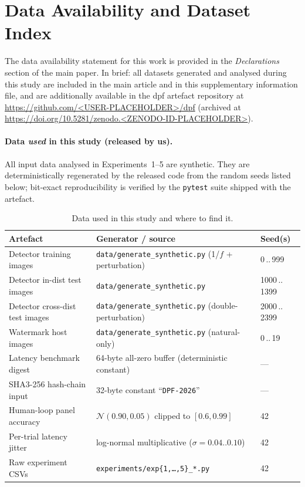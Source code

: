 \documentclass[11pt,a4paper]{article}
\begin{document}
\section{Data Availability and Dataset Index}\label{sec:data-availability}

The data availability statement for this work is provided in the
\emph{Declarations} section of the main paper. In brief: all
datasets generated and analysed during this study are included in
the main article and in this supplementary information file, and
are additionally available in the dpf artefact repository at
\url{https://github.com/<USER-PLACEHOLDER>/dpf}
(archived at
\url{https://doi.org/10.5281/zenodo.<ZENODO-ID-PLACEHOLDER>}).

\paragraph{Data \emph{used} in this study (released by us).}
All input data analysed in Experiments~1--5 are synthetic. They are
deterministically regenerated by the released code from the random
seeds listed below; bit-exact reproducibility is verified by the
\texttt{pytest} suite shipped with the artefact.

\begin{table}[!ht]\centering
\caption{Data used in this study and where to find it.}
\label{tab:data-index}
\small
\setlength{\tabcolsep}{4pt}
\begin{tabular}{l l l}
\toprule
Artefact & Generator / source & Seed(s) \\
\midrule
Detector training images        & \texttt{data/generate\_synthetic.py} (1/$f$ + perturbation) & 0\,..\,999 \\
Detector in-dist test images    & \texttt{data/generate\_synthetic.py} & 1000\,..\,1399 \\
Detector cross-dist test images & \texttt{data/generate\_synthetic.py} (double-perturbation) & 2000\,..\,2399 \\
Watermark host images           & \texttt{data/generate\_synthetic.py} (natural-only) & 0\,..\,19 \\
Latency benchmark digest        & 64-byte all-zero buffer (deterministic constant) & --- \\
SHA3-256 hash-chain input       & 32-byte constant ``\texttt{DPF-2026}'' & --- \\
Human-loop panel accuracy       & $\mathcal{N}(0.90,0.05)$ clipped to $[0.6, 0.99]$ & 42 \\
Per-trial latency jitter        & log-normal multiplicative ($\sigma=0.04..0.10$) & 42 \\
Raw experiment CSVs             & \texttt{experiments/exp\{1,\dots,5\}\_*.py} & 42 \\
\bottomrule
\end{tabular}
\end{table}
\end{document}
